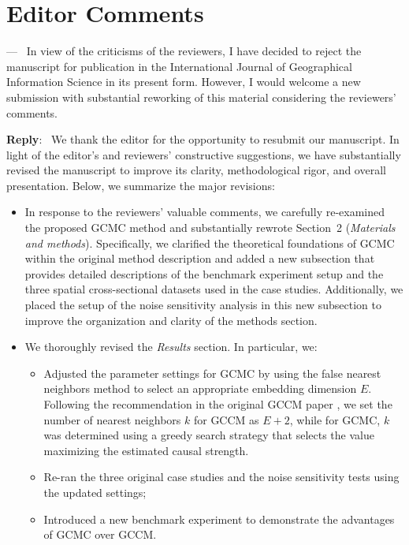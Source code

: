 \documentclass[11pt]{article}
\newcounter{reviewer}
\newcounter{point}[reviewer]
\newenvironment{point1}
   {\refstepcounter{point} \bigskip \noindent {\textbf{Editor Comment~}} ---\ }
   {\par }
\newenvironment{reply}
   {\medskip \noindent \color{blue} \begin{sf}\textbf{Reply}:\  }
   {\medskip \par \end{sf}}
\begin{document}
\section*{Editor Comments}
\begin{point1}
In view of the criticisms of the reviewers, I have decided to reject the manuscript for publication in the International Journal of Geographical Information Science in its present form. However, I would welcome a new submission with substantial reworking of this material considering the reviewers' comments.
\end{point1}
\begin{reply}
We thank the editor for the opportunity to resubmit our manuscript. In light of the editor’s and reviewers’ constructive suggestions, we have substantially revised the manuscript to improve its clarity, methodological rigor, and overall presentation. Below, we summarize the major revisions:

\begin{itemize}
  \item In response to the reviewers’ valuable comments, we carefully re-examined the proposed GCMC method and substantially rewrote Section~2 (\textit{Materials and methods}). Specifically, we clarified the theoretical foundations of GCMC within the original method description and added a new subsection that provides detailed descriptions of the benchmark experiment setup and the three spatial cross-sectional datasets used in the case studies. Additionally, we placed the setup of the noise sensitivity analysis in this new subsection to improve the organization and clarity of the methods section.
  
  \item We thoroughly revised the \textit{Results} section. In particular, we:
  \begin{itemize}
    \item Adjusted the parameter settings for GCMC by using the false nearest neighbors method \citep{kennel1992fnn} to select an appropriate embedding dimension $E$. Following the recommendation in the original GCCM paper \citep{gao2023gccm}, we set the number of nearest neighbors $k$ for GCCM as $E + 2$, while for GCMC, $k$ was determined using a greedy search strategy that selects the value maximizing the estimated causal strength.
    \item Re-ran the three original case studies and the noise sensitivity tests using the updated settings;
    \item Introduced a new benchmark experiment to demonstrate the advantages of GCMC over GCCM.
  \end{itemize}
  

\end{itemize}
\end{reply}
\end{document}

